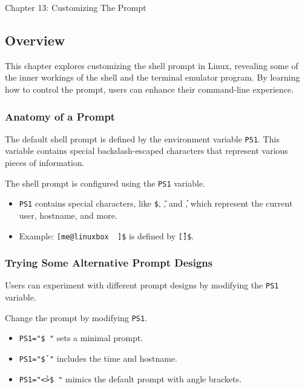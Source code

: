 \begin{notes}{Chapter 13: Customizing The Prompt}
    \subsection*{Overview}

    This chapter explores customizing the shell prompt in Linux, revealing some of the inner workings of the shell and the terminal emulator program. By learning how to control the prompt, users can 
    enhance their command-line experience.
    
    \subsubsection*{Anatomy of a Prompt}
    
    The default shell prompt is defined by the environment variable \texttt{PS1}. This variable contains special backslash-escaped characters that represent various pieces of information.
    
    \begin{highlight}
    
    The shell prompt is configured using the \texttt{PS1} variable.
    
    \begin{itemize}
        \item \texttt{PS1} contains special characters, like \texttt{\$}, \texttt{\u}, and \texttt{\h}, which represent the current user, hostname, and more.
        \item Example: \texttt{[me@linuxbox ~]\$} is defined by \texttt{[\u@\h \W]\$}.
    \end{itemize}
    
    \end{highlight}
    
    \subsubsection*{Trying Some Alternative Prompt Designs}
    
    Users can experiment with different prompt designs by modifying the \texttt{PS1} variable.
    
    \begin{highlight}
    
    Change the prompt by modifying \texttt{PS1}.
    
    \begin{itemize}
        \item \texttt{PS1="\$ "} sets a minimal prompt.
        \item \texttt{PS1="\A \h \$ "} includes the time and hostname.
        \item \texttt{PS1="<\u@\h \W>\$ "} mimics the default prompt with angle brackets.
    \end{itemize}
    

\end{highlight}
\end{notes}
